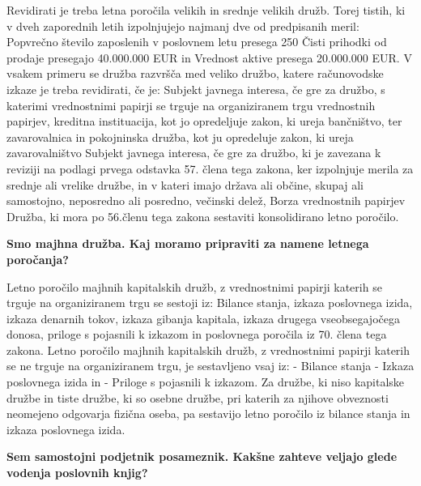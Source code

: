 \documentclass[a4paper,12pt,openright]{book}
\begin{document}
Revidirati je treba letna poročila velikih in srednje velikih družb. Torej tistih, ki v dveh zaporednih letih izpolnjujejo najmanj dve od predpisanih meril:
Popvrečno število zaposlenih v poslovnem letu presega 250
Čisti prihodki od prodaje presegajo 40.000.000 EUR in
Vrednost aktive presega 20.000.000 EUR.
V vsakem primeru se družba razvršča med veliko družbo, katere računovodske izkaze je treba revidirati, če je:
Subjekt javnega interesa, če gre za družbo, s katerimi vrednostnimi papirji se trguje na organiziranem trgu vrednostnih papirjev, kreditna instituacija, kot jo opredeljuje zakon, ki ureja bančništvo, ter zavarovalnica in pokojninska družba, kot ju opredeluje zakon, ki ureja zavarovalništvo
Subjekt javnega interesa, če gre za družbo, ki je zavezana k reviziji na podlagi prvega odstavka 57. člena tega zakona, ker izpolnjuje merila za srednje ali vrelike družbe, in v kateri imajo država ali občine, skupaj ali samostojno, neposredno ali posredno, večinski delež,
Borza vrednostnih papirjev
Družba, ki mora po 56.členu tega zakona sestaviti konsolidirano letno poročilo.

\textbf{Smo majhna družba. Kaj moramo pripraviti za namene letnega poročanja?}

Letno poročilo majhnih kapitalskih družb, z vrednostnimi papirji katerih se trguje na organiziranem trgu se sestoji iz:
Bilance stanja, izkaza poslovnega izida, izkaza denarnih tokov, izkaza gibanja kapitala, izkaza drugega vseobsegajočega donosa, priloge s pojasnili k izkazom in poslovnega poročila iz 70. člena tega zakona.
Letno poročilo majhnih kapitalskih družb, z vrednostnimi papirji katerih se ne trguje na organiziranem trgu, je sestavljeno vsaj iz:
- Bilance stanja
- Izkaza poslovnega izida in
- Priloge s pojasnili k izkazom.
Za družbe, ki niso kapitalske družbe in tiste družbe, ki so osebne družbe, pri katerih za njihove obveznosti neomejeno odgovarja fizična oseba, pa sestavijo letno poročilo iz bilance stanja in izkaza poslovnega izida.

\textbf{Sem samostojni podjetnik posameznik. Kakšne zahteve veljajo glede vodenja poslovnih knjig?}
\end{document}
